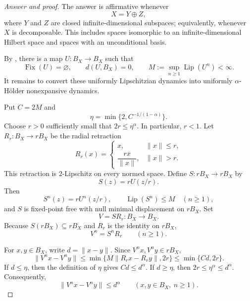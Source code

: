 \documentclass[11pt,reqno]{amsart}
\theoremstyle{plain}
\theoremstyle{definition}
\begin{document}
\begin{proof}[Answer and proof]
The answer is affirmative whenever
\begin{equation*}
 X=Y\oplus Z,
\end{equation*}
where $Y$ and $Z$ are closed infinite-dimensional subspaces; equivalently, whenever $X$ is decomposable. This includes spaces isomorphic to an infinite-dimensional Hilbert space and spaces with an unconditional basis.

By , there is a map $U\colon B_X\to B_X$ such that
\begin{equation*}
 \operatorname{Fix}(U)=\varnothing,
 \qquad d(U,B_X)=0,
 \qquad M:=\sup_{n\geq1}\operatorname{Lip}(U^n)<\infty.
\end{equation*}
It remains to convert these uniformly Lipschitzian dynamics into uniformly $\alpha$-H\"older nonexpansive dynamics.

Put $C=2M$ and
\begin{equation*}
 \eta=\min\{2,C^{-1/(1-\alpha)}\}.
\end{equation*}
Choose $r>0$ sufficiently small that $2r\leq\eta^\alpha$. In particular, $r<1$. Let $R_r\colon B_X\to rB_X$ be the radial retraction
\begin{equation*}
 R_r(x)=
 \begin{cases}
 x, & \|x\|\leq r,\\[1mm]
 \dfrac{rx}{\|x\|}, & \|x\|>r.
 \end{cases}
\end{equation*}
This retraction is $2$-Lipschitz on every normed space. Define $S\colon rB_X\to rB_X$ by
\begin{equation*}
 S(z)=rU(z/r).
\end{equation*}
Then
\begin{equation*}
 S^n(z)=rU^n(z/r),
 \qquad \operatorname{Lip}(S^n)\leq M
 \quad(n\geq1),
\end{equation*}
and $S$ is fixed-point free with null minimal displacement on $rB_X$. Set
\begin{equation*}
 V=SR_r\colon B_X\longrightarrow B_X.
\end{equation*}
Because $S(rB_X)\subseteq rB_X$ and $R_r$ is the identity on $rB_X$,
\begin{equation*}
 V^n=S^nR_r \qquad(n\geq1).
\end{equation*}

For $x,y\in B_X$, write $d=\|x-y\|$. Since $V^nx,V^ny\in rB_X$,
\begin{equation*}
 \|V^nx-V^ny\| \leq \min\{M\|R_rx-R_ry\|,2r\}\leq \min\{Cd,2r\}.
\end{equation*}
If $d\leq\eta$, then the definition of $\eta$ gives $Cd\leq d^\alpha$. If $d\geq\eta$, then $2r\leq\eta^\alpha\leq d^\alpha$. Consequently,
\begin{equation*}
 \|V^nx-V^ny\|\leq d^\alpha
 \qquad(x,y\in B_X,\ n\geq1).
\end{equation*}


\end{proof}
\end{document}
